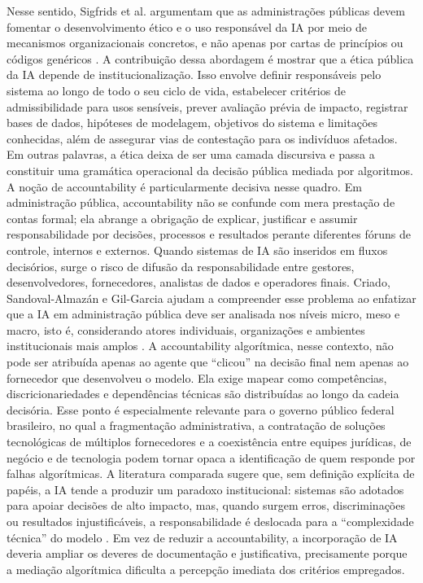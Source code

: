 \documentclass[12pt,a4paper]{article}
\begin{document}
Nesse sentido, Sigfrids et al. argumentam que as administrações públicas devem fomentar o desenvolvimento ético e o uso responsável da IA por meio de mecanismos organizacionais concretos, e não apenas por cartas de princípios ou códigos genéricos \autocite{sigfrids2022how}. A contribuição dessa abordagem é mostrar que a ética pública da IA depende de institucionalização. Isso envolve definir responsáveis pelo sistema ao longo de todo o seu ciclo de vida, estabelecer critérios de admissibilidade para usos sensíveis, prever avaliação prévia de impacto, registrar bases de dados, hipóteses de modelagem, objetivos do sistema e limitações conhecidas, além de assegurar vias de contestação para os indivíduos afetados. Em outras palavras, a ética deixa de ser uma camada discursiva e passa a constituir uma gramática operacional da decisão pública mediada por algoritmos.
A noção de accountability é particularmente decisiva nesse quadro. Em administração pública, accountability não se confunde com mera prestação de contas formal; ela abrange a obrigação de explicar, justificar e assumir responsabilidade por decisões, processos e resultados perante diferentes fóruns de controle, internos e externos. Quando sistemas de IA são inseridos em fluxos decisórios, surge o risco de difusão da responsabilidade entre gestores, desenvolvedores, fornecedores, analistas de dados e operadores finais. Criado, Sandoval-Almazán e Gil-Garcia ajudam a compreender esse problema ao enfatizar que a IA em administração pública deve ser analisada nos níveis micro, meso e macro, isto é, considerando atores individuais, organizações e ambientes institucionais mais amplos \autocite{criado2024artificial}. A accountability algorítmica, nesse contexto, não pode ser atribuída apenas ao agente que “clicou” na decisão final nem apenas ao fornecedor que desenvolveu o modelo. Ela exige mapear como competências, discricionariedades e dependências técnicas são distribuídas ao longo da cadeia decisória.
Esse ponto é especialmente relevante para o governo público federal brasileiro, no qual a fragmentação administrativa, a contratação de soluções tecnológicas de múltiplos fornecedores e a coexistência entre equipes jurídicas, de negócio e de tecnologia podem tornar opaca a identificação de quem responde por falhas algorítmicas. A literatura comparada sugere que, sem definição explícita de papéis, a IA tende a produzir um paradoxo institucional: sistemas são adotados para apoiar decisões de alto impacto, mas, quando surgem erros, discriminações ou resultados injustificáveis, a responsabilidade é deslocada para a “complexidade técnica” do modelo \autocite{mkander2023auditing} \autocite{minkkinen2022continuous}. Em vez de reduzir a accountability, a incorporação de IA deveria ampliar os deveres de documentação e justificativa, precisamente porque a mediação algorítmica dificulta a percepção imediata dos critérios empregados.
\end{document}
